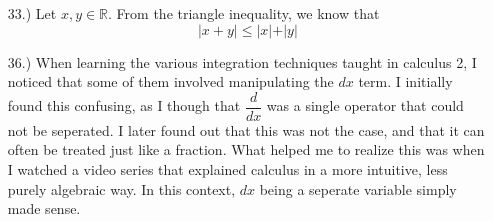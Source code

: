 \documentclass[12pt]{article}
\begin{document}
\begin{itemize}
\begin{itemize}
        \item [b.)] ***
    \end{itemize}



    \item [33.)] Let $x,y\in\mathbb{R}$. From the triangle inequality, we know that
    \[\vert x+y\vert\leq\vert x\vert+\vert y\vert\]





    \item [36.)] When learning the various integration techniques taught in calculus 2, I noticed that some of them involved manipulating the $dx$ term. I initially found this confusing, as I though that $\dfrac{d}{dx}$ was a single operator that could not be seperated. I later found out that this was not the case, and that it can often be treated just like a fraction. What helped me to realize this was when I watched a video series that explained calculus in a more intuitive, less purely algebraic way. In this context, $dx$ being a seperate variable simply made sense.


\end{itemize}
\end{document}
